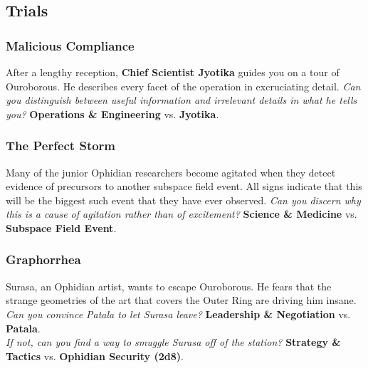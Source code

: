 \documentclass[11pt, a5paper, parskip=half-, DIV=12]{scrartcl}
\begin{document}
\newpage

\subsection*{Trials}
\subsubsection*{Malicious Compliance}
After a lengthy reception, \textbf{Chief Scientist Jyotika} guides you on a tour of Ouroborous. He describes every facet of the operation in excruciating detail. \textit{Can you distinguish between useful information and irrelevant details in what he tells you?} \textbf{Operations \& Engineering} vs. \textbf{Jyotika}.

\subsubsection*{The Perfect Storm}
Many of the junior Ophidian researchers become agitated when they detect evidence of precursors to another subspace field event. All signs indicate that this will be the biggest such event that they have ever observed. \textit{Can you discern why this is a cause of agitation rather than of excitement?} \textbf{Science \& Medicine} vs. \textbf{Subspace Field Event}.


\subsubsection*{Graphorrhea}
Surasa, an Ophidian artist, wants to escape Ouroborous. He fears that the strange geometries of the art that covers the Outer Ring are driving him insane. \textit{Can you convince Patala to let Surasa leave?} \textbf{Leadership \& Negotiation} vs. \textbf{Patala}. \\ \textit{If not, can you find a way to smuggle Surasa off of the station?} \textbf{Strategy \& Tactics} vs. \textbf{Ophidian Security (2d8)}.
\end{document}
